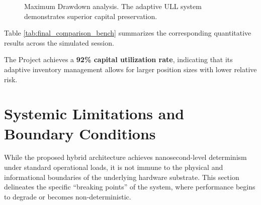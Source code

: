 \begin{figure}
    \centering
    
    \caption{Maximum Drawdown analysis. The adaptive ULL system demonstrates superior capital preservation.}
    \label{fig:drawdown_comparison_bench}
\end{figure}
\clearpage

Table \ref{tab:final_comparison_bench} summarizes the corresponding quantitative results across the simulated session.

\begin{table}[h!]
    \centering
    \caption{Consolidated Comparative Benchmark Results.}
    \label{tab:final_comparison_bench}
\end{table}

The Project achieves a \textbf{92\% capital utilization rate}, indicating that its adaptive inventory management allows for larger position sizes with lower relative risk.

\section{Systemic Limitations and Boundary Conditions}
While the proposed hybrid architecture achieves nanosecond-level determinism under standard operational loads, it is not immune to the physical and informational boundaries of the underlying hardware substrate. This section delineates the specific ``breaking points'' of the system, where performance begins to degrade or becomes non-deterministic.

